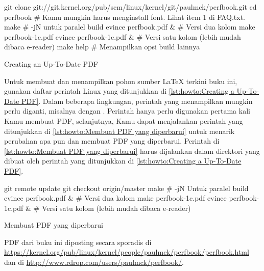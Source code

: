 \begin{listing}
\begin{VerbatimL}[breaklines=true,breakafter=/,
        breakaftersymbolpre=\raisebox{-.7ex}{\textcolor{darkgray}{\Pisymbol{psy}{191}}},
	breaksymbolleft=\textcolor{darkgray}{\tiny\ensuremath{\hookrightarrow}},
        numbers=none,xleftmargin=0pt]
git clone git://git.kernel.org/pub/scm/linux/kernel/git/paulmck/perfbook.git
cd perfbook
# Kamu mungkin harus menginstall font. Lihat item 1 di FAQ.txt.
make                     # -jN untuk paralel build
evince perfbook.pdf &    # Versi dua kolom
make perfbook-1c.pdf
evince perfbook-1c.pdf & # Versi satu kolom (lebih mudah dibaca e-reader)
make help                # Menampilkan opsi build lainnya
\end{VerbatimL}
\caption{Creating an Up-To-Date PDF}
\label{lst:howto:Creating a Up-To-Date PDF}
\end{listing}

Untuk membuat dan menampilkan pohon sumber \LaTeX{} terkini buku ini,
gunakan daftar perintah Linux yang ditunjukkan di
\cref{lst:howto:Creating a Up-To-Date PDF}.
Dalam beberapa lingkungan, perintah  yang menampilkan
 mungkin perlu diganti, misalnya dengan .
Perintah  hanya perlu digunakan pertama kali Kamu membuat PDF,
selanjutnya, Kamu dapat menjalankan perintah yang ditunjukkan di
\cref{lst:howto:Membuat PDF yang diperbarui} untuk menarik perubahan apa pun
dan membuat PDF yang diperbarui.\@
Perintah di \cref{lst:howto:Membuat PDF yang diperbarui} harus dijalankan
dalam direktori  yang dibuat oleh perintah yang ditunjukkan di
\cref{lst:howto:Creating a Up-To-Date PDF}.

\begin{listing}
\begin{VerbatimL}[numbers=none,xleftmargin=0pt]
git remote update
git checkout origin/master
make                     # -jN Untuk paralel build
evince perfbook.pdf &    # Versi dua kolom
make perfbook-1c.pdf
evince perfbook-1c.pdf & # Versi satu kolom (lebih mudah dibaca e-reader)
\end{VerbatimL}
\caption{Membuat PDF yang diperbarui}
\label{lst:howto:Membuat PDF yang diperbarui}
\end{listing}

PDF dari buku ini diposting secara sporadis di
\url{https://kernel.org/pub/linux/kernel/people/paulmck/perfbook/perfbook.html}
dan di
\url{http://www.rdrop.com/users/paulmck/perfbook/}.

